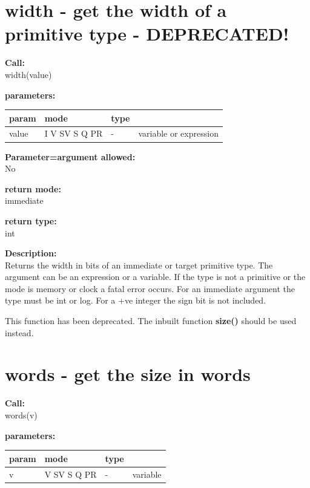     \section{width - get the width of a primitive type - DEPRECATED!}\label{sec:ifwidth}
        
        {\bf Call:} \\
        width(value)
        
        {\bf parameters:} \\
        \begin{tabular}{| l | l | l | l |}
        \hline
        param  & mode & type & \\
        \hline \hline
        value & I V SV S Q PR & -   & variable or expression   \\ \hline
        \end{tabular}
        
        {\bf Parameter=argument allowed:} \\
        No
        
        {\bf return mode:} \\
        immediate

        {\bf return type:} \\
        int
        
        {\bf Description:} \\
        Returns the width in bits of an immediate or target primitive type. The
        argument can be an expression or a variable. If the type is not a
        primitive or the mode is memory or clock a fatal error occurs. For
        an immediate argument the type must be int or log.
        For a +ve integer the sign bit is not included.
        
        This function has been deprecated. The inbuilt function {\bf size()}
         should be used instead.





    \section{words - get the size in words}\label{sec:ifwords}
        
        {\bf Call:} \\
        words(v)
        
        {\bf parameters:} \\
        \begin{tabular}{| l | l | l | l |}
        \hline
        param  & mode & type & \\
        \hline \hline
        v & V SV S Q PR & -   & variable \\ \hline
        \end{tabular}
        
